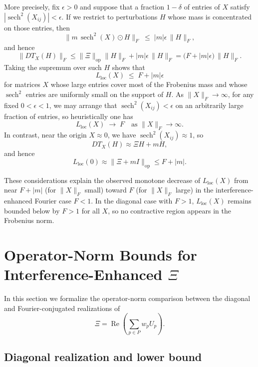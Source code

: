 \documentclass[11pt]{article}
\begin{document}
More precisely, fix $\epsilon>0$ and suppose that a fraction $1-\delta$ of entries of $X$ satisfy $|\operatorname{sech}^2(X_{ij})|<\epsilon$. If we restrict to perturbations $H$ whose mass is concentrated on those entries, then
\[
  \|m\,\operatorname{sech}^2(X)\odot H\|_F \;\leq\; |m|\epsilon\,\|H\|_F,
\]
and hence
\[
  \|DT_X(H)\|_F 
  \le \|\Xi\|_{\mathrm{op}}\|H\|_F + |m|\epsilon\,\|H\|_F
  = \bigl(F + |m|\epsilon\bigr)\,\|H\|_F.
\]
Taking the supremum over such $H$ shows that
\[
  L_{\mathrm{loc}}(X) \;\leq\; F + |m|\epsilon
\]
for matrices $X$ whose large entries cover most of the Frobenius mass and whose $\operatorname{sech}^2$ entries are uniformly small on the support of $H$. As $\|X\|_F\to\infty$, for any fixed $0<\epsilon<1$, we may arrange that $\operatorname{sech}^2(X_{ij})<\epsilon$ on an arbitrarily large fraction of entries, so heuristically one has
\[
  L_{\mathrm{loc}}(X) \;\to\; F
\quad\text{as }\|X\|_F\to\infty.
\]
In contrast, near the origin $X\approx 0$, we have $\operatorname{sech}^2(X_{ij})\approx 1$, so
\[
  DT_X(H) \approx \Xi H + m H,
\]
and hence
\[
  L_{\mathrm{loc}}(0) \approx \|\Xi + m I\|_{\mathrm{op}} \le F + |m|.
\]

These considerations explain the observed monotone decrease of $L_{\mathrm{loc}}(X)$ from near $F+|m|$ (for $\|X\|_F$ small) toward $F$ (for $\|X\|_F$ large) in the interference-enhanced Fourier case $F<1$. In the diagonal case with $F>1$, $L_{\mathrm{loc}}(X)$ remains bounded below by $F>1$ for all $X$, so no contractive region appears in the Frobenius norm.

\section{Operator-Norm Bounds for Interference-Enhanced $\Xi$}

In this section we formalize the operator-norm comparison between the diagonal and Fourier-conjugated realizations of
\[
  \Xi = \operatorname{Re}\left(\sum_{p\in P} w_p U_p\right).
\]

\subsection{Diagonal realization and lower bound}
\end{document}
